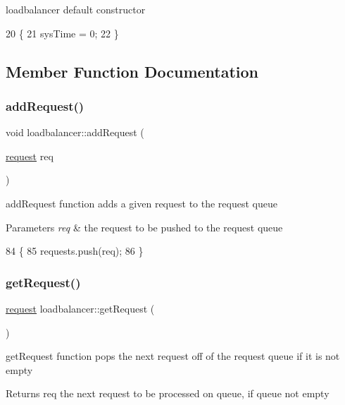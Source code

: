 loadbalancer default constructor 
\begin{DoxyCode}
20                            \{
21     sysTime = 0;
22 \}
\end{DoxyCode}


\subsection{Member Function Documentation}
\mbox{\label{classloadbalancer_a2c45d009dffc50f5d5d3a6c2b295311d}} 
\subsubsection{\texorpdfstring{add\+Request()}{addRequest()}}
{\footnotesize\ttfamily void loadbalancer\+::add\+Request (\begin{DoxyParamCaption}\item[{\hyperlink{structrequest}{request}}]{req }\end{DoxyParamCaption})}

add\+Request function adds a given request to the request queue 
\begin{DoxyParams}{Parameters}
{\em req} & the request to be pushed to the request queue \\
\hline
\end{DoxyParams}

\begin{DoxyCode}
84                                          \{
85     requests.push(req);
86 \}
\end{DoxyCode}
\mbox{\label{classloadbalancer_a3d1715e4b2218a7aa9ad74e3e4fa6167}} 
\subsubsection{\texorpdfstring{get\+Request()}{getRequest()}}
{\footnotesize\ttfamily \hyperlink{structrequest}{request} loadbalancer\+::get\+Request (\begin{DoxyParamCaption}{ }\end{DoxyParamCaption})}

get\+Request function pops the next request off of the request queue if it is not empty \begin{DoxyReturn}{Returns}
req the next request to be processed on queue, if queue not empty 
\end{DoxyReturn}

